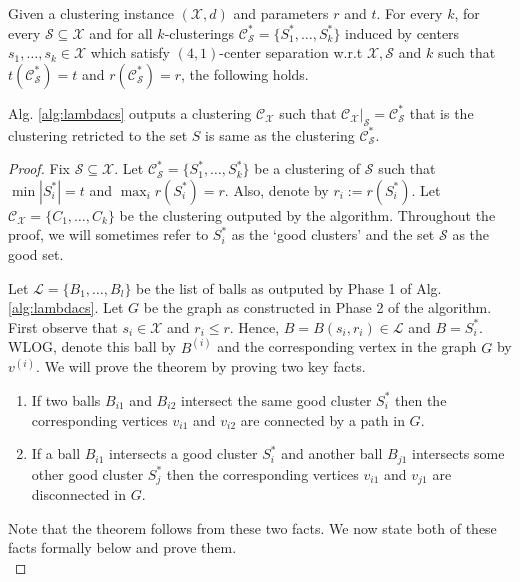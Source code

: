 \documentclass[anon,12pt]{colt2016} %
\newcommand{\mc}{\mathcal}
\begin{document}
\begin{theorem}
\label{thm:lambdacsnoise}
Given a clustering instance $(\mc X, d)$ and parameters $r$ and $t$. For every $k$, for every $\mc S \subseteq \mc X$ and for all $k$-clusterings $\mc C^*_{\mc S} = \{S_1^*, \ldots, S_k^*\}$ induced by centers $s_1, \ldots, s_k \in \mc X$ which satisfy $(4, 1)$-center separation w.r.t $\mc X, \mc S$ and $k$ such that $ t(\mc C_{\mc S}^*) = t$ and $r(\mc C_{\mc S}^*) = r$, the following holds.

Alg. \ref{alg:lambdacs} outputs a clustering $\mc C_{\mc X}$ such that $\mc C_{\mc X}|_{\mc S} = \mc C_{\mc S}^*$ that is the clustering retricted to the set $S$ is same as the clustering $\mc C_{\mc S}^*$.
\end{theorem}
\begin{proof}
Fix $\mc S \subseteq \mc X$. Let $\mc C_{\mc S}^* = \{S_1^*, \ldots, S_k^*\}$ be a clustering of $\mc S$ such that $\min |S_i^*| = t$ and $\max_i r(S_i^*) = r$. Also, denote by $r_i := r(S_i^*)$. Let $\mc C_{\mc X} = \{C_1, \ldots, C_k\}$ be the clustering outputed by the algorithm. Throughout the proof, we will sometimes refer to $S_i^*$ as the `good clusters' and the set $\mc S$ as the good set.

Let $\mc L = \{B_1, \ldots, B_l\}$ be the list of balls as outputed by Phase 1 of Alg. \ref{alg:lambdacs}. Let $G$ be the graph as constructed in Phase 2 of the algorithm. First observe that $s_i \in \mc X$ and $r_i \le r$. Hence, $B = B(s_i, r_i) \in \mc L$ and $B = S_i^*$. WLOG, denote this ball by $B^{(i)}$ and the corresponding vertex in the graph $G$ by $v^{(i)}$. We will prove the theorem by proving two key facts.  

\begin{enumerate}[nolistsep, noitemsep, label=\textbf{F.\arabic*}]
\renewcommand\labelitemi{$\diamond$}
\item \label{fact:lambda1} If two balls $B_{i1}$ and $B_{i2}$ intersect the same good cluster $S_i^*$ then the corresponding vertices $v_{i1}$ and $v_{i2}$ are connected by a path in $G$.
\item \label{fact:lambda2} If a ball $B_{i1}$ intersects a good cluster $S_i^*$ and another ball $B_{j1}$ intersects some other good cluster $S_j^*$ then the corresponding vertices $v_{i1}$ and $v_{j1}$ are disconnected in $G$.	
\end{enumerate}
Note that the theorem follows from these two facts. We now state both of these facts formally below and prove them.\\


\end{proof}
\end{document}

